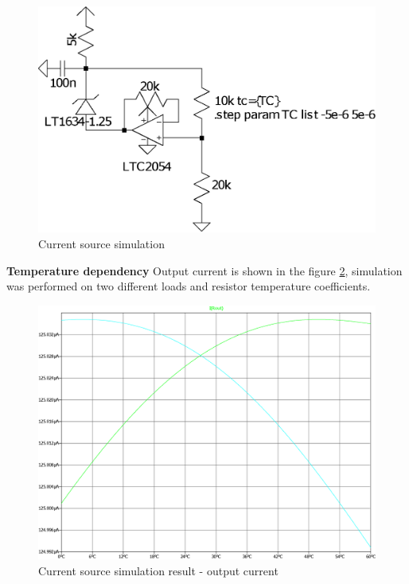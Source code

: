         \begin{figure}[H]
            \centering
            \includegraphics[width=0.5\paperwidth]{img/06/current_source.eps}
            \caption{Current source simulation}
            \label{current_source_simulation}
        \end{figure}

        \bigskip\textbf{Temperature dependency}
        Output current is shown in the figure \ref{current_source_simulation_result}, simulation was performed on two different loads and resistor temperature coefficients.
        \begin{figure}[H]
            \centering
            \includegraphics[width=0.8\paperwidth]{img/06/current_source_result.eps}
            \caption{Current source simulation result - output current}
            \label{current_source_simulation_result}
        \end{figure}


